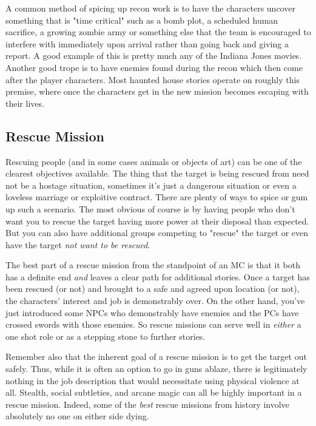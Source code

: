 A common method of spicing up recon work is to have the characters uncover something that is "time critical" such as a bomb plot, a scheduled human sacrifice, a growing zombie army or something else that the team is encouraged to interfere with immediately upon arrival rather than going back and giving a report. A good example of this is pretty much any of the Indiana Jones movies. Another good trope is to have enemies found during the recon which then come after the player characters. Most haunted house stories operate on roughly this premise, where once the characters get in the new mission becomes escaping with their lives.

\subsection{Rescue Mission}

Rescuing people (and in some cases animals or objects of art) can be one of the clearest objectives available. The thing that the target is being rescued from need not be a hostage situation, sometimes it's just a dangerous situation or even a loveless marriage or exploitive contract. There are plenty of ways to spice or gum up such a scenario. The most obvious of course is by having people who don't want you to rescue the target having more power at their disposal than expected. But you can also have additional groups competing to "rescue" the target or even have the target \textit{not want to be rescued}.

The best part of a rescue mission from the standpoint of an MC is that it both has a definite end \textit{and} leaves a clear path for additional stories. Once a target has been rescued (or not) and brought to a safe and agreed upon location (or not), the characters' interest and job is demonstrably over. On the other hand, you've just introduced some NPCs who demonstrably have enemies and the PCs have crossed swords with those enemies. So rescue missions can serve well in \textit{either} a one shot role or as a stepping stone to further stories.

Remember also that the inherent goal of a rescue mission is to get the target out safely. Thus, while it is often an option to go in guns ablaze, there is legitimately nothing in the job description that would necessitate using physical violence at all. Stealth, social subtleties, and arcane magic can all be highly important in a rescue mission. Indeed, some of the \textit{best} rescue missions from history involve absolutely no one on either side dying. 

